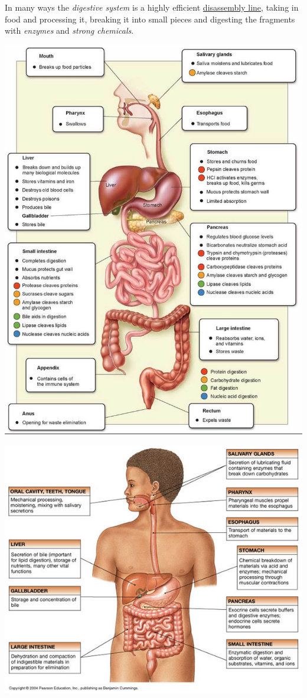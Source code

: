\documentclass[11pt]{article}
\begin{document}
In many ways the \emph{digestive system} is a highly efficient \uline{disassembly line}, taking
in food and processing it, breaking it into small pieces and digesting the
fragments with \emph{enzymes} and \emph{strong chemicals}.

\begin{center}
\includegraphics[width=.9\linewidth]{book/image777_2016-11-15_19-45-50.jpg}
\end{center}

\begin{center}
\includegraphics[width=.9\linewidth]{book/digestive-system-aldy-organ-donation-project_2016-11-15_19-44-36.jpg}
\end{center}
\end{document}
